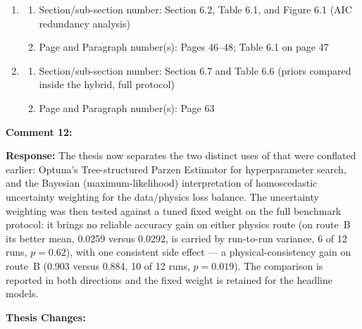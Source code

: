 \documentclass[12pt,a4paper]{article}
\begin{document}
\begin{enumerate}
    \item
    \begin{enumerate}
        \item Section/sub-section number: Section 6.2, Table 6.1, and Figure 6.1 (AIC redundancy analysis)
        \item Page and Paragraph number(s): Pages 46--48; Table 6.1 on page 47
    \end{enumerate}
    \item
    \begin{enumerate}
        \item Section/sub-section number: Section 6.7 and Table 6.6 (priors compared inside the hybrid, full protocol)
        \item Page and Paragraph number(s): Page 63
    \end{enumerate}
\end{enumerate}

\vspace{\baselineskip}

\textbf{Comment 12:} 

\vspace{\baselineskip}

\textbf{Response:} The thesis now separates the two distinct uses of
 that were conflated earlier: Optuna's Tree-structured Parzen
Estimator for hyperparameter search, and the Bayesian (maximum-likelihood)
interpretation of homoscedastic uncertainty weighting \cite{kendall2018,wen2024}
for the data/physics loss balance. The uncertainty weighting was then tested
against a tuned fixed weight on the full benchmark protocol: it brings no
reliable accuracy gain on either physics route (on route~B its better mean,
0.0259 versus 0.0292, is carried by run-to-run variance, 6 of 12 runs,
$p = 0.62$), with one consistent side effect --- a physical-consistency gain
on route~B (0.903 versus 0.884, 10 of 12 runs, $p = 0.019$). The comparison is
reported in both directions and the fixed weight is retained for the headline
models.

\vspace{\baselineskip}

\textbf{Thesis Changes:}
\end{document}
